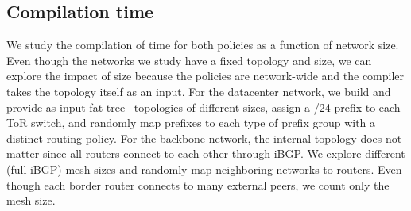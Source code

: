 \documentclass[10pt]{sigalternate052015}
\begin{document}
\subsection{Compilation time}




We study the compilation of time for both policies as a function of network size. Even though the networks we study have a fixed topology and size, we can explore the impact of size because the policies are network-wide and the compiler takes the topology itself as an input. For the datacenter network, we build and provide as input fat tree~\cite{fattree} topologies of different sizes, assign a /24 prefix to each ToR switch, and randomly map prefixes to each type of prefix group with a distinct routing policy.
For the backbone network, the internal topology does not matter since all routers connect to each other through iBGP. We explore different (full iBGP) mesh sizes and randomly map neighboring networks to routers. Even though each border router connects to many external peers, we count only the mesh size.
\end{document}
